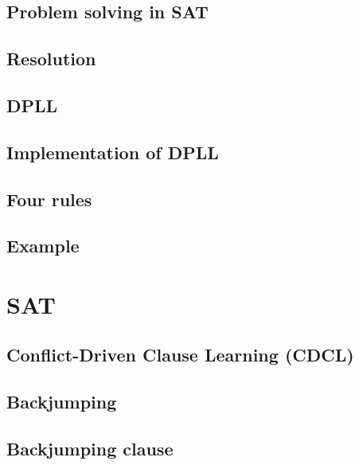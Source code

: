 \documentclass[12pt,a4paper,twoside]{book}
\begin{document}
\section{Problem solving in SAT}

\label{s_5_9}

\section{Resolution}

\label{s_5_10}

\section{DPLL}

\label{s_5_11}

\section{Implementation of DPLL}

\label{s_5_12}

\section{Four rules}

\label{s_5_13}

\section{Example}

\label{s_5_14}

\chapter{SAT }

\label{c_6}

\section{Conflict-Driven Clause Learning (CDCL)}

\label{s_6_1}

\section{Backjumping}

\label{s_6_2}

\section{Backjumping clause}

\label{s_6_3}
\end{document}
